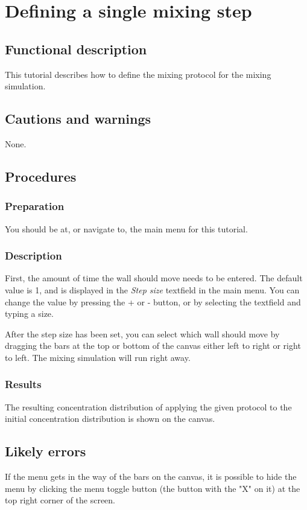 \section{Defining a single mixing step}
\label{sec:singleStepMix}

\subsection{Functional description}
This tutorial describes how to define the mixing protocol for the mixing simulation.

\subsection{Cautions and warnings}
None.

\subsection{Procedures}
\subsubsection{Preparation}
You should be at, or navigate to, the main menu for this tutorial.

\subsubsection{Description}
First, the amount of time the wall should move needs to be entered. The default value is 1, and is displayed in the \emph{Step size} textfield in the main menu. You can change the value by pressing the + or - button, or by selecting the textfield and typing a size.

After the step size has been set, you can select which wall should move by dragging the bars at the top or bottom of the canvas either left to right or right to left. The mixing simulation will run right away.

\subsubsection{Results}
The resulting concentration distribution of applying the given protocol to the initial concentration distribution is shown on the canvas.

\subsection{Likely errors}
If the menu gets in the way of the bars on the canvas, it is possible to hide the menu by clicking the menu toggle button (the button with the "X" on it) at the top right corner of the screen.

